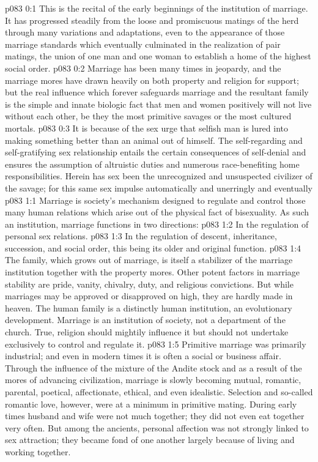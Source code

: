 \author{Chief of Seraphim}
\vs p083 0:1 This is the recital of the early beginnings of the institution of marriage. It has progressed steadily from the loose and promiscuous matings of the herd through many variations and adaptations, even to the appearance of those marriage standards which eventually culminated in the realization of pair matings, the union of one man and one woman to establish a home of the highest social order.
\vs p083 0:2 Marriage has been many times in jeopardy, and the marriage mores have drawn heavily on both property and religion for support; but the real influence which forever safeguards marriage and the resultant family is the simple and innate biologic fact that men and women positively will not live without each other, be they the most primitive savages or the most cultured mortals.
\vs p083 0:3 It is because of the sex urge that selfish man is lured into making something better than an animal out of himself. The self\hyp{}regarding and self\hyp{}gratifying sex relationship entails the certain consequences of self\hyp{}denial and ensures the assumption of altruistic duties and numerous race\hyp{}benefiting home responsibilities. Herein has sex been the unrecognized and unsuspected civilizer of the savage; for this same sex impulse automatically and unerringly  and eventually 
\vs p083 1:1 Marriage is society’s mechanism designed to regulate and control those many human relations which arise out of the physical fact of bisexuality. As such an institution, marriage functions in two directions:
\vs p083 1:2 \bibnobreakspace In the regulation of personal sex relations.
\vs p083 1:3 \bibnobreakspace In the regulation of descent, inheritance, succession, and social order, this being its older and original function.
\vs p083 1:4 \pc The family, which grows out of marriage, is itself a stabilizer of the marriage institution together with the property mores. Other potent factors in marriage stability are pride, vanity, chivalry, duty, and religious convictions. But while marriages may be approved or disapproved on high, they are hardly made in heaven. The human family is a distinctly human institution, an evolutionary development. Marriage is an institution of society, not a department of the church. True, religion should mightily influence it but should not undertake exclusively to control and regulate it.
\vs p083 1:5 Primitive marriage was primarily industrial; and even in modern times it is often a social or business affair. Through the influence of the mixture of the Andite stock and as a result of the mores of advancing civilization, marriage is slowly becoming mutual, romantic, parental, poetical, affectionate, ethical, and even idealistic. Selection and so\hyp{}called romantic love, however, were at a minimum in primitive mating. During early times husband and wife were not much together; they did not even eat together very often. But among the ancients, personal affection was not strongly linked to sex attraction; they became fond of one another largely because of living and working together.
